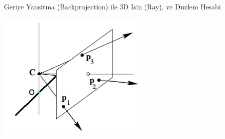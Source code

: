 \documentclass[12pt,fleqn]{article}\usepackage{../../common}
\begin{document}
Geriye Yansitma (Backprojection) ile 3D Isin (Ray), ve Duzlem Hesabi

\includegraphics[width=20em]{vision_80ray_01.png}
\end{document}
